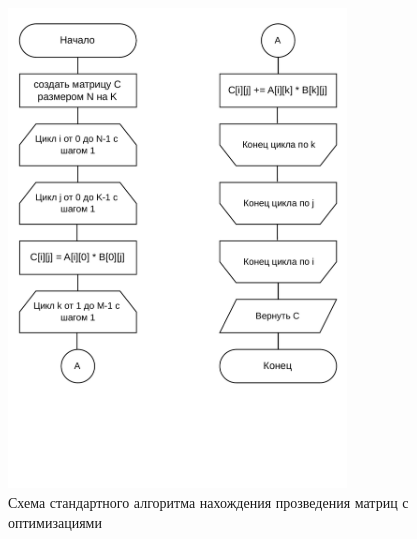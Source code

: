 \begin{figure}[h!]
	\centering
	\includegraphics[height=0.8\textheight, width=0.8\textwidth]{tex_parts/scheme2.pdf}
	\caption{\label{fig:sto}Схема стандартного алгоритма нахождения прозведения матриц с оптимизациями}
\end{figure}

\clearpage

